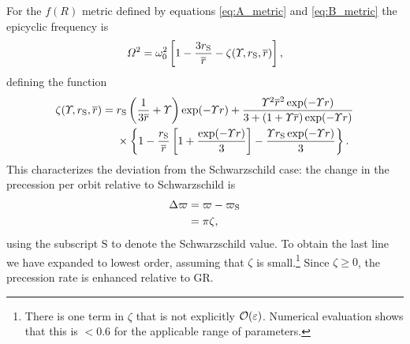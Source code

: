For the $f(R)$ metric defined by equations \eqref{eq:A_metric} and \eqref{eq:B_metric} the epicyclic frequency is
\begin{equation}
\Omega^2 = \omega_0^2 \left[1 - \frac{3r_\mathrm{S}}{\overline{r}} - \zeta(\Upsilon,r_\mathrm{S},\overline{r})\right],
\end{equation}
defining the function
\begin{align}
\zeta(\Upsilon,r_\mathrm{S},\overline{r}) = {} & r_\mathrm{S}\left(\frac{1}{3\overline{r}} + \Upsilon\right)\exp(-\Upsilon r) + \frac{\Upsilon^2\overline{r}^2\exp(-\Upsilon r)}{3 + (1 + \Upsilon \overline{r})\exp(-\Upsilon r)} \nonumber \\
 & {} \times \left\{1 - \frac{r_\mathrm{S}}{\overline{r}}\left[1 + \frac{\exp(-\Upsilon r)}{3}\right] - \frac{\Upsilon r_\mathrm{S}\exp(-\Upsilon r)}{3}\right\}.
\end{align}
This characterizes the deviation from the Schwarzschild case: the change in the precession per orbit relative to Schwarzschild is
\begin{align}
\upDelta \varpi = {} & \varpi - \varpi\sub{S} \\
 = {} & \pi\zeta,
\end{align}
using the subscript $\mathrm{S}$ to denote the Schwarzschild value. To obtain the last line we have expanded to lowest order, assuming that $\zeta$ is small.\footnote{There is one term in $\zeta$ that is not explicitly $\mathcal{O}({\varepsilon})$. Numerical evaluation shows that this is $< 0.6$ for the applicable range of parameters.} Since $\zeta \geq 0$, the precession rate is enhanced relative to GR.

